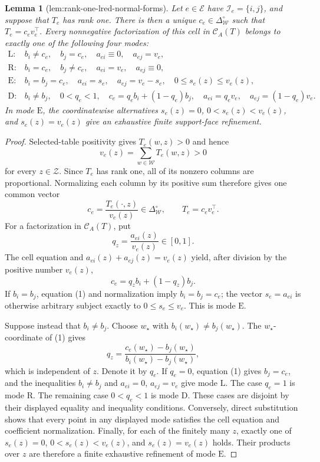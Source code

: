 \documentclass{article}
\newtheorem{lemma}{Lemma}
\begin{document}
\begin{lemma}[lem:rank-one-lred-normal-forms]\label{lem:rank-one-lred-normal-forms}
Let \(e\in\mathcal E\) have \(\mathcal I_e=\{i,j\}\), and suppose that \(T_e\) has rank one.  There is then a unique \(c_e\in\Delta_{\mathcal W}^{\circ}\) such that \(T_e=c_ev_e^{\top}\).  Every nonnegative factorization of this cell in \(\mathcal C_A(T)\) belongs to exactly one of the following four modes:
\[
\begin{array}{ll}
\mathrm L:& b_i\ne c_e,\quad b_j=c_e,\quad a_{ei}\equiv0,\quad a_{ej}=v_e,\\
\mathrm R:& b_i=c_e,\quad b_j\ne c_e,\quad a_{ei}=v_e,\quad a_{ej}\equiv0,\\
\mathrm E:& b_i=b_j=c_e,\quad a_{ei}=s_e,\quad a_{ej}=v_e-s_e,
             \quad 0\le s_e(z)\le v_e(z),\\
\mathrm D:& b_i\ne b_j,\quad 0<q_e<1,\quad
             c_e=q_eb_i+(1-q_e)b_j,\quad
             a_{ei}=q_ev_e,\quad a_{ej}=(1-q_e)v_e.
\end{array}
\]
In mode \(\mathrm E\), the coordinatewise alternatives \(s_e(z)=0\), \(0<s_e(z)<v_e(z)\), and \(s_e(z)=v_e(z)\) give an exhaustive finite support-face refinement.
\end{lemma}
\begin{proof}
Selected-table positivity gives \(T_e(w,z)>0\) and hence
\[
v_e(z)=\sum_{w\in\mathcal W}T_e(w,z)>0
\]
for every \(z\in\mathcal Z\).  Since \(T_e\) has rank one, all of its nonzero columns are proportional.  Normalizing each column by its positive sum therefore gives one common vector
\[
c_e=\frac{T_e(\cdot,z)}{v_e(z)}\in\Delta_{\mathcal W}^{\circ},
\qquad T_e=c_ev_e^{\top}.
\]
For a factorization in \(\mathcal C_A(T)\), put
\[
q_z=\frac{a_{ei}(z)}{v_e(z)}\in[0,1].
\]
The cell equation and \(a_{ei}(z)+a_{ej}(z)=v_e(z)\) yield, after division by the positive number \(v_e(z)\),
\[
c_e=q_zb_i+(1-q_z)b_j. \tag{1}
\]
If \(b_i=b_j\), equation (1) and normalization imply \(b_i=b_j=c_e\); the vector \(s_e=a_{ei}\) is otherwise arbitrary subject exactly to \(0\le s_e\le v_e\).  This is mode \(\mathrm E\).

Suppose instead that \(b_i\ne b_j\).  Choose \(w_\star\) with \(b_i(w_\star)\ne b_j(w_\star)\).  The \(w_\star\)-coordinate of (1) gives
\[
q_z=\frac{c_e(w_\star)-b_j(w_\star)}{b_i(w_\star)-b_j(w_\star)},
\]
which is independent of \(z\).  Denote it by \(q_e\).  If \(q_e=0\), equation (1) gives \(b_j=c_e\), and the inequalities \(b_i\ne b_j\) and \(a_{ei}=0\), \(a_{ej}=v_e\) give mode \(\mathrm L\).  The case \(q_e=1\) is mode \(\mathrm R\).  The remaining case \(0<q_e<1\) is mode \(\mathrm D\).  These cases are disjoint by their displayed equality and inequality conditions.  Conversely, direct substitution shows that every point in any displayed mode satisfies the cell equation and coefficient normalization.  Finally, for each of the finitely many \(z\), exactly one of \(s_e(z)=0\), \(0<s_e(z)<v_e(z)\), and \(s_e(z)=v_e(z)\) holds.  Their products over \(z\) are therefore a finite exhaustive refinement of mode \(\mathrm E\).
\end{proof}
\end{document}
